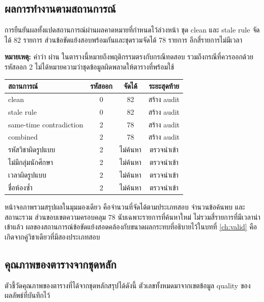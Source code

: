 \documentclass[12pt,a4paper]{article}
\begin{document}
\subsection{ผลการทำงานตามสถานการณ์}
การยืนยันผลทั้งแปดสถานการณ์ผ่านผลคาดหมายที่กำหนดไว้ล่วงหน้า ชุด clean และ stale rule จัดได้ 82 รายการ ส่วนข้อขัดแย้งสอบพร้อมกันและชุดรวมจัดได้ 78 รายการ อีกสี่รายการไม่มีเวลา

\noindent\textbf{หมายเหตุ:} คำว่า ผ่าน ในตารางนี้หมายถึงพฤติกรรมตรงกับกรณีทดสอบ รวมถึงกรณีที่ควรออกด้วยรหัสออก 2 ไม่ได้หมายความว่าชุดข้อมูลผิดพลาดให้ตารางที่พร้อมใช้

\begin{center}\begin{minipage}{\textwidth}\centering
{}\label{tab:scenarios}
\begin{tabular}{L{4.6cm}ccc}\toprule
สถานการณ์ & รหัสออก & จัดได้ & ระยะสุดท้าย \\\midrule
clean & 0 & 82 & สร้าง audit \\
stale rule & 0 & 82 & สร้าง audit \\
same-time contradiction & 2 & 78 & สร้าง audit \\
combined & 2 & 78 & สร้าง audit \\
รหัสวิชาผิดรูปแบบ & 2 & ไม่ค้นหา & ตรวจนำเข้า \\
ไม่มีกลุ่มนักศึกษา & 2 & ไม่ค้นหา & ตรวจนำเข้า \\
เวลาผิดรูปแบบ & 2 & ไม่ค้นหา & ตรวจนำเข้า \\
ชื่อห้องซ้ำ & 2 & ไม่ค้นหา & ตรวจนำเข้า \\\bottomrule
\end{tabular}\end{minipage}\end{center}
หน้าจอภาพรวมสรุปผลในมุมมองเดียว คือจำนวนที่จัดได้ตามประเภทสอบ จำนวนข้อค้นพบ และสถานะรวม ส่วนขอบเขตความครอบคลุม 78 นับเฉพาะรายการที่ค้นหาใหม่ ไม่รวมสี่รายการที่มีเวลานำเข้าแล้ว ผลของสถานการณ์ข้อขัดแย้งสอดคล้องกับขนาดผลกระทบที่อธิบายไว้ในบทที่ \ref{ch:valid} คือเกิดจากคู่วิชาเดียวที่มีสองประเภทสอบ
\subsection{คุณภาพของตารางจากชุดหลัก}
ตัวชี้วัดคุณภาพของตารางที่ได้จากชุดหลักสรุปได้ดังนี้ ตัวเลขทั้งหมดมาจากเขตข้อมูล quality ของผลลัพธ์ที่บันทึกไว้
\end{document}
